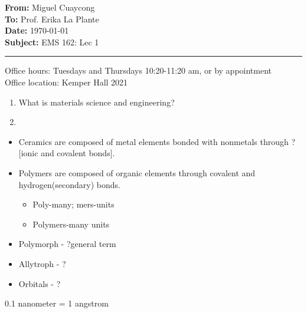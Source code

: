 \documentclass[11pt]{article}
\newcommand{\memoheader}[4]{
  \noindent
  \textbf{From:} #2\\ 
  \textbf{To:} #1\\
  \textbf{Date:} #3\\
  \textbf{Subject:} #4\\[1ex]\hrule\vspace{1.5ex}
}
\begin{document}
\memoheader{Prof. Erika La Plante}
            {Miguel Cuaycong}
            {\today}
            {EMS 162: Lec 1}
\noindent Office hours: Tuesdays and Thursdays 10:20-11:20 am, or by appointment
\\
Office location: Kemper Hall 2021
\begin{enumerate}
    \item What is materials science and engineering?
    \item 
\end{enumerate}
\begin{itemize}
    \item Ceramics are composed of metal elements bonded with nonmetals through ?[ionic and covalent bonds].
    \item Polymers are composed of organic elements through covalent and hydrogen(secondary) bonds.
    \begin{itemize}
        \item Poly-many; mers-units
        \item Polymers-many units
    \end{itemize}
    \item Polymorph - ?general term
    \item Allytroph - ?
    \item Orbitals - ?
\end{itemize}
0.1 nanometer = 1 angstrom
\end{document}
